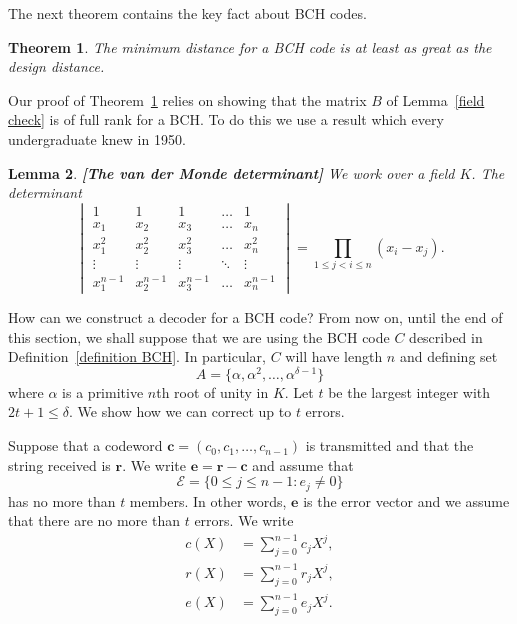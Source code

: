 \documentclass[12pt,a4paper]{article}
\theoremstyle{plain}
\newtheorem{theorem}{Theorem}[section]
\newtheorem{lemma}[theorem]{Lemma}
\theoremstyle{definition}
\begin{document}
    The next theorem contains the key fact about BCH codes.
    \begin{theorem}
        \label{BCH}
        The minimum distance for a BCH code
        is at least as great as the design distance.
    \end{theorem}

    Our proof of Theorem~\ref{BCH} relies on showing that
    the matrix $B$ of Lemma~\ref{field check} is of full rank
    for a BCH. To do this we use a result which every undergraduate
    knew in 1950.
    \begin{lemma}{\bf [The van der Monde determinant]}
        \label{L;van der Monde}
        We work over a field $K$. The determinant
        \begin{equation*}
            \begin{vmatrix}
                1&1&1&\hdots&1\\
                x_{1}&x_{2}&x_{3}&\hdots&x_{n}\\
                x_{1}^{2}&x_{2}^{2}&x_{3}^{2}&\hdots&x_{n}^{2}\\
                \vdots&\vdots&\vdots&\ddots&\vdots\\
                x_{1}^{n-1}&x_{2}^{n-1}&x_{3}^{n-1}&\hdots&x_{n}^{n-1}
            \end{vmatrix}
            =\prod_{1\leq j<i\leq n}(x_{i}-x_{j}).
        \end{equation*}
    \end{lemma}

    How can we construct a decoder for a BCH code? From
    now on, until the end of this section, we shall
    suppose that we are using the BCH code $C$ described
    in Definition~\ref{definition BCH}. In
    particular, $C$ will have length $n$ and
    defining set
    \[A=\{\alpha,\alpha^{2},\dots,\alpha^{\delta-1}\}\]
    where $\alpha$ is a primitive $n$th root of unity
    in $K$. Let $t$ be the largest integer with $2t+1\leq\delta$.
    We show how we can correct up to $t$ errors.


    Suppose that a codeword
    ${\mathbf c}=(c_{0},c_{1},\dots,c_{n-1})$ is
    transmitted and that the string received is
    ${\mathbf r}$. We write
    ${\mathbf e}={\mathbf r}-{\mathbf c}$
    and assume that
    \[{\mathcal E}=\{0\leq j\leq n-1:e_{j}\neq 0\}\]
    has no more than $t$ members.
    In other words, ${\mathbf e}$ is the error vector
    and we assume that there are no more than
    $t$ errors.
    We write
    \begin{align*}
        c(X)&=\sum_{j=0}^{n-1}c_{j}X^{j},\\
        r(X)&=\sum_{j=0}^{n-1}r_{j}X^{j},\\
        e(X)&=\sum_{j=0}^{n-1}e_{j}X^{j}.
    \end{align*}
\end{document}

